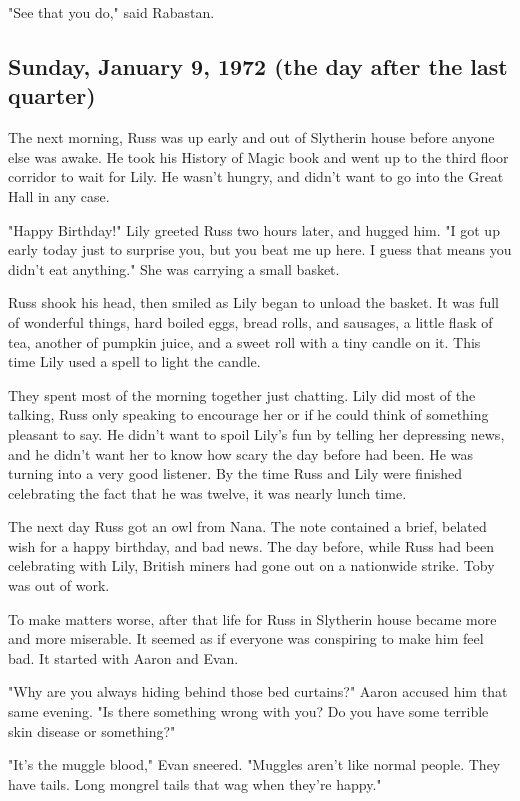 \documentclass[a4paper,11pt]{article}
\begin{document}
"See that you do," said Rabastan.

\subsection{Sunday, January 9, 1972 (the day after the last quarter)}

The next morning, Russ was up early and out of Slytherin house before anyone else was awake. He took his History of Magic book and went up to the third floor corridor to wait for Lily. He wasn't hungry, and didn't want to go into the Great Hall in any case.

"Happy Birthday!" Lily greeted Russ two hours later, and hugged him. "I got up early today just to surprise you, but you beat me up here. I guess that means you didn't eat anything." She was carrying a small basket.

Russ shook his head, then smiled as Lily began to unload the basket. It was full of wonderful things, hard boiled eggs, bread rolls, and sausages, a little flask of tea, another of pumpkin juice, and a sweet roll with a tiny candle on it. This time Lily used a spell to light the candle.

They spent most of the morning together just chatting. Lily did most of the talking, Russ only speaking to encourage her or if he could think of something pleasant to say. He didn't want to spoil Lily's fun by telling her depressing news, and he didn't want her to know how scary the day before had been. He was turning into a very good listener. By the time Russ and Lily were finished celebrating the fact that he was twelve, it was nearly lunch time.

The next day Russ got an owl from Nana. The note contained a brief, belated wish for a happy birthday, and bad news. The day before, while Russ had been celebrating with Lily, British miners had gone out on a nationwide strike. Toby was out of work.

To make matters worse, after that life for Russ in Slytherin house became more and more miserable. It seemed as if everyone was conspiring to make him feel bad. It started with Aaron and Evan.

"Why are you always hiding behind those bed curtains?" Aaron accused him that same evening. "Is there something wrong with you? Do you have some terrible skin disease or something?"

"It's the muggle blood," Evan sneered. "Muggles aren't like normal people. They have tails. Long mongrel tails that wag when they're happy."
\end{document}
